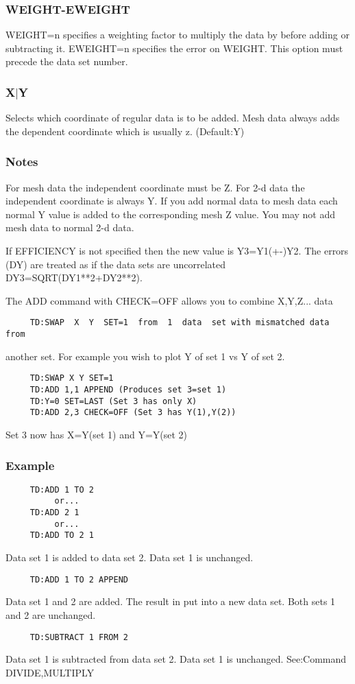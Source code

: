 \subsubsection{WEIGHT-EWEIGHT}
WEIGHT=n  specifies  a  weighting factor to multiply the data by before
adding or subtracting it.  EWEIGHT=n specifies  the  error  on  WEIGHT.
This option must precede the data set number.  
\subsubsection{X$|$Y}
Selects  which  coordinate  of  regular data is to be added.  Mesh data
always adds the dependent coordinate which is usually z.  (Default:Y) 
\subsubsection{Notes}
For  mesh  data the independent coordinate must be Z.  For 2-d data the
independent coordinate is always Y.  If you add  normal  data  to  mesh
data  each  normal  Y value is added to the corresponding mesh Z value.
You may not add mesh data to normal 2-d data.  

If  EFFICIENCY is not specified then the new value is Y3=Y1(+-)Y2.  The
errors  (DY)  are  treated  as  if  the  data  sets  are   uncorrelated
DY3=SQRT(DY1**2+DY2**2).  

The ADD command with CHECK=OFF allows you to combine X,Y,Z...  data 
\begin{verbatim}
     TD:SWAP  X  Y  SET=1  from  1  data  set with mismatched data from
\end{verbatim}
another set.  For example you wish to plot Y of set 1 vs Y of set 2.  
\begin{verbatim}
     TD:SWAP X Y SET=1 
     TD:ADD 1,1 APPEND (Produces set 3=set 1) 
     TD:Y=0 SET=LAST (Set 3 has only X) 
     TD:ADD 2,3 CHECK=OFF (Set 3 has Y(1),Y(2)) 
\end{verbatim}
Set 3 now has X=Y(set 1) and Y=Y(set 2) 
\subsubsection{Example}
\begin{verbatim}
     TD:ADD 1 TO 2 
          or...  
     TD:ADD 2 1 
          or...  
     TD:ADD TO 2 1 
\end{verbatim}
Data set 1 is added to data set 2.  Data set 1 is unchanged.  
\begin{verbatim}
     TD:ADD 1 TO 2 APPEND 
\end{verbatim}
Data  set  1  and  2 are added.  The result in put into a new data set.
Both sets 1 and 2 are unchanged.  
\begin{verbatim}
     TD:SUBTRACT 1 FROM 2 
\end{verbatim}
Data set 1 is subtracted from data set 2.  Data set 1 is unchanged.  
See:Command DIVIDE,MULTIPLY 
